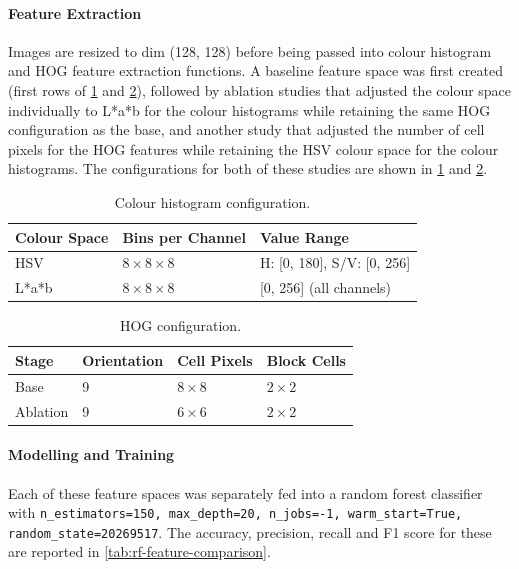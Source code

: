 \paragraph{Feature Extraction}
\label{sec:feat-extract}
Images are resized to dim (128, 128) before being passed into colour histogram and HOG feature extraction functions. A baseline feature space was first created (first rows of \cref{tab:colour-hist-config}
and \cref{tab:hog-config}), followed by ablation studies that adjusted the colour space individually to L*a*b for the colour histograms while retaining the same HOG configuration as the base, and another
study that adjusted the number of cell pixels for the HOG features while retaining the HSV colour space for the colour histograms. The configurations for both of these studies are shown in
\cref{tab:colour-hist-config} and \cref{tab:hog-config}.

\begin{table}[h]
  \centering
  \small
  \caption{Colour histogram configuration.}
  \label{tab:colour-hist-config}
  \begin{tabular}{@{}lll@{}}
    \toprule
    Colour Space & Bins per Channel      & Value Range                \\
    \midrule
    HSV          & $8 \times 8 \times 8$ & H: [0, 180], S/V: [0, 256] \\
    L*a*b        & $8 \times 8 \times 8$ & [0, 256] (all channels)    \\
    \bottomrule
  \end{tabular}
\end{table}

\begin{table}[h]
  \centering
  \small
  \caption{HOG configuration.}
  \label{tab:hog-config}
  \begin{tabular}{@{}llll@{}}
    \toprule
    Stage    & Orientation & Cell Pixels  & Block Cells  \\
    \midrule
    Base     & 9           & $8 \times 8$ & $2 \times 2$ \\
    Ablation & 9           & $6 \times 6$ & $2 \times 2$ \\
    \bottomrule
  \end{tabular}
\end{table}

\paragraph{Modelling and Training}
\label{sec:model-and-train-rf}
Each of these feature spaces was separately fed into a random forest classifier with \texttt{n\_estimators=150, max\_depth=20, n\_jobs=-1, warm\_start=True, random\_state=20269517}. The accuracy, precision,
recall and F1 score for these are reported in \cref{tab:rf-feature-comparison}.

